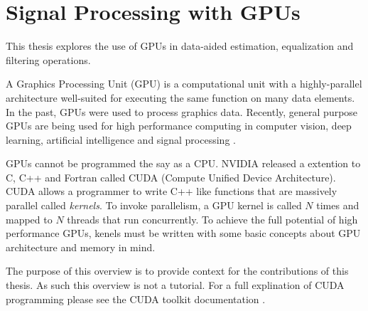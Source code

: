 

\chapter{Signal Processing with GPUs}
\label{sec:gpu}

This thesis explores the use of GPUs in data-aided estimation, equalization and filtering operations.

A Graphics Processing Unit (GPU) is a computational unit with a highly-parallel architecture well-suited for executing the same function on many data elements.
In the past, GPUs were used to process graphics data.
Recently, general purpose GPUs are being used for high performance computing in computer vision, deep learning, artificial intelligence and signal processing \cite{wikipedia-gpu:2015}.

GPUs cannot be programmed the say as a CPU. 
NVIDIA released a extention to C, C++ and Fortran called CUDA (Compute Unified Device Architecture).
CUDA allows a programmer to write C++ like functions that are massively parallel called \textit{kernels}.
To invoke parallelism, a GPU kernel is called $N$ times and mapped to $N$ threads that run concurrently.
To achieve the full potential of high performance GPUs, kenels must be written with some basic concepts about GPU architecture and memory in mind.

The purpose of this overview is to provide context for the contributions of this thesis.
As such this overview is not a tutorial.
For a full explination of CUDA programming please see the CUDA toolkit documentation \cite{CUDA_toolkit_doc}.

